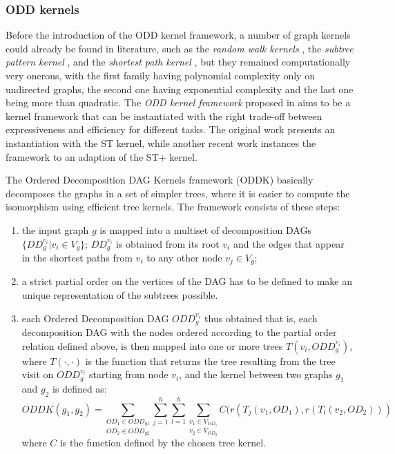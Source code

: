 \subsubsection{ODD kernels}
\label{subsubsec:odd}

Before the introduction of the ODD kernel framework, a number of graph kernels
could already be found in literature, such as the \emph{random walk kernels} \cite{Gaertner04mlj},
the \emph{subtree pattern kernel} \cite{ramon03graphkernels}, and the \emph{shortest path kernel}
\cite{borgwardt05graphkernel}, but they remained computationally very onerous, with
the first family having polynomial complexity only on undirected graphs, the second one
having exponential complexity and the last one being more than quadratic.
The \emph{ODD kernel framework} proposed in \cite{DBLP:conf/sdm/MartinoNS12} aims
to be a kernel framework that can be instantiated with the right trade-off between
expressiveness and efficiency for different tasks.
The original work presents an instantiation with the ST kernel, while another
recent work \cite{dasanmartino2015exploiting} instances the framework to an adaption
of the ST+ kernel.

The Ordered Decomposition DAG Kernels framework (ODDK) basically decomposes the
graphs in a set of simpler trees, where it is easier to compute the isomorphism
using efficient tree kernels.
The framework consists of these steps:

\begin{enumerate}
    \item the input graph $g$ is mapped into a multiset of decomposition DAGs\\
        $\{DD_g^{v_i}|v_i \in V_g\}$; $DD_g^{v_i}$ is obtained from its root $v_i$
        and the edges that appear in the shortest paths from $v_i$ to any other node
        $v_j \in V_g$;
    \item a strict partial order on the vertices of the DAG has to be defined
        to make an unique representation of the subtrees possible.
    \item each Ordered Decomposition DAG $ODD_g^{v_i}$ thus obtained that is, each
        decomposition DAG with the nodes ordered according to the partial
        order relation defined above, is then mapped into
        one or more trees $T(v_i,ODD_g^{v_i})$, where $T(\cdot,\cdot)$ is the function
        that returns the tree resulting from the tree visit on $ODD_g^{v_i}$ starting
        from node $v_i$, and the kernel between two graphs $g_1$ and $g_2$ is
        defined as:
        \begin{equation}
            ODDK(g_1,g_2) = \underset{OD_2 \in ODD_{g2}}{\underset{OD_1 \in ODD_{g1}}{\sum}}
            \sum_{j=1}^h\sum_{l=1}^h
            \underset{v_2 \in V_{OD_2}}{\underset{v_1 \in V_{OD_1}}{\sum}}
            C(r(T_j(v_1,OD_1),r(T_l(v_2,OD_2)))
        \end{equation}
        where $C$ is the function defined by the chosen tree kernel.
\end{enumerate}

